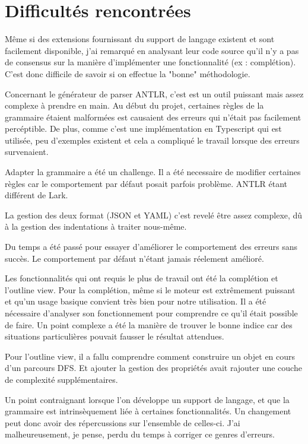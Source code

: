 \documentclass[
    iict, %
    il, %
]{heig-tb}
\begin{document}
\section{Difficultés rencontrées}

Même si des extensions fournissant du support de langage existent et sont facilement disponible, j'ai remarqué en analysant leur code source qu'il n'y a pas de consensus sur la manière d'implémenter une fonctionnalité (ex : complétion).
C'est donc difficile de savoir si on effectue la "bonne" méthodologie.

Concernant le générateur de parser ANTLR, c'est est un outil puissant mais assez complexe à prendre en main.
Au début du projet, certaines règles de la grammaire étaient malformées est causaient des erreurs qui n'était pas facilement percéptible.
De plus, comme c'est une implémentation en Typescript qui est utilisée, peu d'exemples existent et cela a compliqué le travail lorsque des erreurs survenaient.

Adapter la grammaire a été un challenge. Il a été necessaire de modifier certaines règles car le comportement par défaut posait parfois problème. ANTLR étant différent de Lark.

La gestion des deux format (JSON et YAML) c'est revelé être assez complexe, dû à la gestion des indentations à traiter nous-même.

Du temps a été passé pour essayer d'améliorer le comportement des erreurs sans succès. Le comportement par défaut n'étant jamais réelement amélioré.

Les fonctionnalités qui ont requis le plus de travail ont été la complétion et l'outline view.
Pour la complétion, même si le moteur est extrêmement puissant et qu'un usage basique convient très bien pour notre utilisation.
Il a été nécessaire d'analyser son fonctionnement pour comprendre ce qu'il était possible de faire.
Un point complexe a été la manière de trouver le bonne indice car des situations particulières pouvait fausser le résultat attendues.

Pour l'outline view, il a fallu comprendre comment construire un objet en cours d'un parcours DFS. Et ajouter la gestion des propriétés avait rajouter une couche de complexité supplémentaires.

Un point contraignant lorsque l'on développe un support de langage, et que la grammaire est intrinsèquement liée à certaines fonctionnalités.
Un changement peut donc avoir des répercussions sur l'ensemble de celles-ci.
J'ai malheureusement, je pense, perdu du temps à corriger ce genres d'erreurs.
\end{document}
